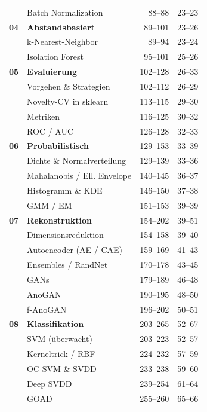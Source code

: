 \documentclass[10pt]{article}
\newlength{\folienbreite}\setlength{\folienbreite}{117mm}
\newlength{\folienhoehe}\setlength{\folienhoehe}{87.75mm} %
\begin{document}
{\begin{minipage}[t]{\folienbreite}
{\begin{minipage}[t][\dimexpr2\folienhoehe+7mm\relax][t]{\dimexpr\folienbreite-2\fboxrule\relax}
\begin{minipage}{\dimexpr\folienbreite-13mm\relax}
\begin{tabular}{@{}llrr@{}}
        & \quad Batch Normalization & 88--88 & 23--23 \\
        \textbf{04} & \textbf{Abstandsbasiert} & 89--101 & 23--26 \\
        & \quad k-Nearest-Neighbor & 89--94 & 23--24 \\
        & \quad Isolation Forest & 95--101 & 25--26 \\
        \textbf{05} & \textbf{Evaluierung} & 102--128 & 26--33 \\
        & \quad Vorgehen \& Strategien & 102--112 & 26--29 \\
        & \quad Novelty-CV in sklearn & 113--115 & 29--30 \\
        & \quad Metriken & 116--125 & 30--32 \\
        & \quad ROC / AUC & 126--128 & 32--33 \\
        \textbf{06} & \textbf{Probabilistisch} & 129--153 & 33--39 \\
        & \quad Dichte \& Normalverteilung & 129--139 & 33--36 \\
        & \quad Mahalanobis / Ell. Envelope & 140--145 & 36--37 \\
        & \quad Histogramm \& KDE & 146--150 & 37--38 \\
        & \quad GMM / EM & 151--153 & 39--39 \\
        \textbf{07} & \textbf{Rekonstruktion} & 154--202 & 39--51 \\
        & \quad Dimensionsreduktion & 154--158 & 39--40 \\
        & \quad Autoencoder (AE / CAE) & 159--169 & 41--43 \\
        & \quad Ensembles / RandNet & 170--178 & 43--45 \\
        & \quad GANs & 179--189 & 46--48 \\
        & \quad AnoGAN & 190--195 & 48--50 \\
        & \quad f-AnoGAN & 196--202 & 50--51 \\
        \textbf{08} & \textbf{Klassifikation} & 203--265 & 52--67 \\
        & \quad SVM (überwacht) & 203--223 & 52--57 \\
        & \quad Kerneltrick / RBF & 224--232 & 57--59 \\
        & \quad OC-SVM \& SVDD & 233--238 & 59--60 \\
        & \quad Deep SVDD & 239--254 & 61--64 \\
        & \quad GOAD & 255--260 & 65--66 \\

\end{tabular}
\end{minipage}
\end{minipage}}
\end{minipage}}
\end{document}

